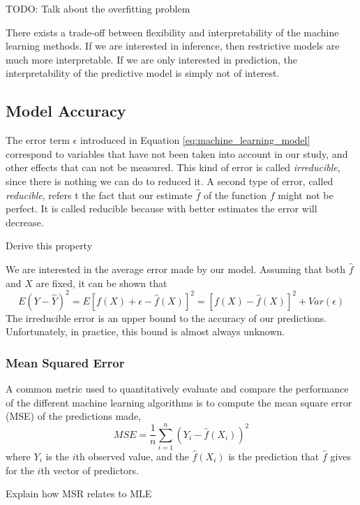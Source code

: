 {\color{red} TODO: Talk about the overfitting problem}

{\color{red} There exists a trade-off between flexibility and interpretability of the machine learning methods. If we are interested in inference, then restrictive models are much more interpretable. If we are only interested in prediction, the interpretability of the predictive model is simply not of interest.}


\subsection{Model Accuracy}

The error term $\epsilon$ introduced in Equation \ref{eq:machine_learning_model} correspond to variables that have not been taken into account in our study, and other effects that can not be measured. This kind of error is called \emph{irreducible}, since there is nothing we can do to reduced it. A second type of error, called \emph{reducible}, refers t the fact that our estimate $\hat{f}$ of the function $f$ might not be perfect. It is called reducible because with better estimates the error will decrease.

{\color{red} Derive this property}

We are interested in the average error made by our model. Assuming that both $\hat{f}$ and $X$ are fixed, it can be shown that
\[
    E\left(Y-\hat{Y}\right)^{2}=E\left[f\left(X\right)+\epsilon-\hat{f}\left(X\right)\right]^{2}=\left[f\left(X\right)-\hat{f}\left(X\right)\right]^{2}+Var\left(\epsilon\right)
\]
The irreducible error is an upper bound to the accuracy of our predictions. Unfortunately, in practice, this bound is almost always unknown.

\subsubsection{Mean Squared Error}

A common metric used to quantitatively evaluate and compare the performance of the different machine learning algorithms is to compute the mean square error (MSE) of the predictions made,
\[
    MSE = \frac{1}{n} \sum_{i=1}^n \left( Y_i - \hat{f}(X_i) \right) ^ 2
\]
where $Y_i$ is the $i$th observed value, and the $\hat{f}(X_i)$ is the prediction that $\hat{f}$ gives for the $i$th vector of predictors.

    {\color{red} Explain how MSR relates to MLE}

